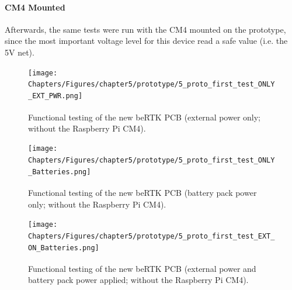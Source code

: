 \paragraph{CM4 Mounted}	Afterwards, the same tests were run with the CM4 mounted on the prototype, since the most important voltage level for this device read a safe value (i.e. the 5V net).



\begin{figure}[h]
	\centering
	\texttt{[image: Chapters/Figures/chapter5/prototype/5\_proto\_first\_test\_ONLY\_EXT\_PWR.png]}
	\caption{Functional testing of the new beRTK\textsuperscript{\textregistered} PCB (external power only; without the Raspberry Pi CM4).}
	\label{fig:5_proto_first_test_ONLY_EXT_PWR}
\end{figure}%

\begin{figure}[h]
	\centering
	\texttt{[image: Chapters/Figures/chapter5/prototype/5\_proto\_first\_test\_ONLY\_Batteries.png]}
	\caption{Functional testing of the new beRTK\textsuperscript{\textregistered} PCB (battery pack power only; without the Raspberry Pi CM4).}
	\label{fig:5_proto_first_test_ONLY_Batteries}
\end{figure}%

\begin{figure}[h]
	\centering
	\texttt{[image: Chapters/Figures/chapter5/prototype/5\_proto\_first\_test\_EXT\_ON\_Batteries.png]}
	\caption{Functional testing of the new beRTK\textsuperscript{\textregistered} PCB (external power and battery pack power applied; without the Raspberry Pi CM4).}
	\label{fig:5_proto_first_test_EXT_ON_Batteries}
\end{figure}%







